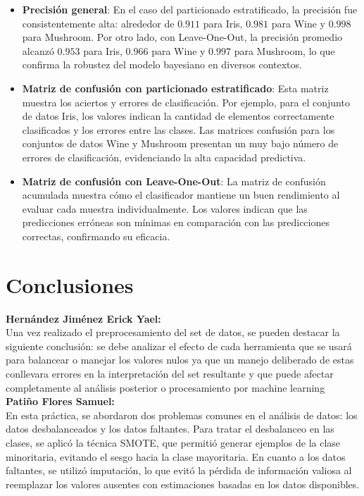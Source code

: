 \documentclass{article}
\begin{document}
    \begin{itemize}
        \item \textbf{Precisión general}: En el caso del particionado estratificado, la precisión fue consistentemente alta: alrededor de $0.911$ para Iris, $0.981$ para Wine y $0.998$ para Mushroom. Por otro lado, con Leave-One-Out, la precisión promedio alcanzó $0.953$ para Iris, $0.966$ para Wine y $0.997$ para Mushroom, lo que confirma la robustez del modelo bayesiano en diversos contextos.
        \item \textbf{Matriz de confusión con particionado estratificado}: Esta matriz muestra los aciertos y errores de clasificación. Por ejemplo, para el conjunto de datos Iris, los valores indican la cantidad de elementos correctamente clasificados y los errores entre las clases. Las matrices confusión para los conjuntos de datos Wine y Mushroom presentan un muy bajo número de errores de clasificación, evidenciando la alta capacidad predictiva.
        \item \textbf{Matriz de confusión con Leave-One-Out}: La matriz de confusión acumulada muestra cómo el clasificador mantiene un buen rendimiento al evaluar cada muestra individualmente. Los valores indican que las predicciones erróneas son mínimas en comparación con las predicciones correctas, confirmando su eficacia.
    \end{itemize}

    \section{Conclusiones} 
    
    \textbf{\Large Hernández Jiménez Erick Yael:} \\
    
    Una vez realizado el preprocesamiento del set de datos, se pueden destacar la siguiente conclusión: se debe analizar el efecto de cada herramienta que se usará para balancear o manejar los valores nulos ya que un manejo deliberado de estas conllevara errores en la interpretación del set resultante y que puede afectar completamente al análisis posterior o procesamiento por machine learning \\
    
    \textbf{\Large Patiño Flores Samuel:} \\
    
    En esta práctica, se abordaron dos problemas comunes en el análisis de datos: los datos desbalanceados y los datos faltantes. Para tratar el desbalanceo en las clases, se aplicó la técnica SMOTE, que permitió generar ejemplos de la clase minoritaria, evitando el sesgo hacia la clase mayoritaria. En cuanto a los datos faltantes, se utilizó imputación, lo que evitó la pérdida de información valiosa al reemplazar los valores ausentes con estimaciones basadas en los datos disponibles. \\
    
\end{document}

